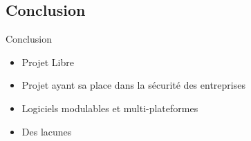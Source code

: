 \documentclass[t,12pt]{beamer}
\begin{document}
	\subsection{Conclusion}
		\begin{frame}{Conclusion}                                                         %
		\begin{itemize}
			\item Projet Libre
			\newline
			\item Projet ayant sa place dans la sécurité des entreprises
			\newline
			\item Logiciels modulables et multi-plateformes
			\newline
			\item Des lacunes 
		\end{itemize}
		\end{frame}
\end{document}
